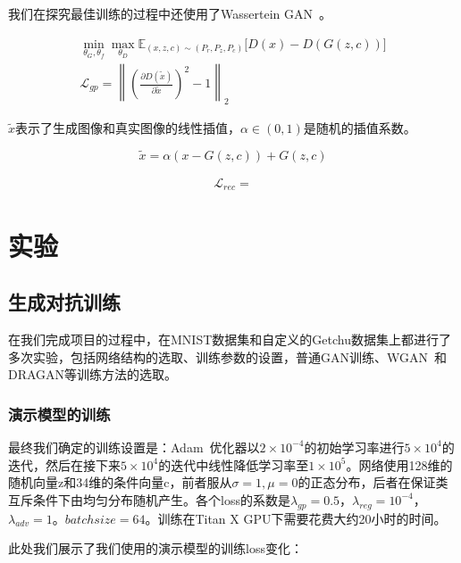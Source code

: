 \documentclass[a4paper,12pt,UTF8]{ctexart}
\newcommand{\norm}[1]{\left\lVert#1\right\rVert}
\begin{document}
我们在探究最佳训练的过程中还使用了Wassertein GAN~\cite{2017arXiv170107875A}。


\begin{align}
  \min_{\theta_G,\theta_f} \max_{\theta_D} \mathbb{E}_{(x, z, c) \sim (P_r, P_z, P_c)} \Big[ D(x) - D(G(z, c))\Big] \\
  \mathcal{L}_{gp} = \norm{\left(\frac{\partial D(\tilde x)}{\partial \tilde x}\right)^2 - 1 }_2
\end{align}

$\tilde x$表示了生成图像和真实图像的线性插值，$\alpha \in (0, 1)$是随机的插值系数。

\begin{equation}
  \tilde x = \alpha (x - G(z, c)) + G(z, c)
\end{equation}


\begin{align}
  \mathcal{L}_{rec} =
\end{align}

\section{实验}

\subsection{生成对抗训练}

在我们完成项目的过程中，在MNIST数据集和自定义的Getchu数据集上都进行了多次实验，包括网络结构的选取、训练参数的设置，普通GAN训练、WGAN~\cite{2017arXiv170107875A}和DRAGAN等训练方法的选取。

\subsubsection{演示模型的训练}

最终我们确定的训练设置是：Adam~\cite{Kingma2014Adam}优化器以$2 \times 10^{-4}$的初始学习率进行$5 \times 10^{4}$的迭代，然后在接下来$5 \times 10^{4}$的迭代中线性降低学习率至$1 \times 10^{5}$。网络使用128维的随机向量z和34维的条件向量c，前者服从$\sigma=1, \mu=0$的正态分布，后者在保证类互斥条件下由均匀分布随机产生。各个loss的系数是$\lambda_{gp}=0.5$，$\lambda_{reg}=10^{-4}$，$\lambda_{adv}=1$。$batchsize=64$。训练在Titan X GPU下需要花费大约20小时的时间。

此处我们展示了我们使用的演示模型的训练loss变化：
\end{document}
